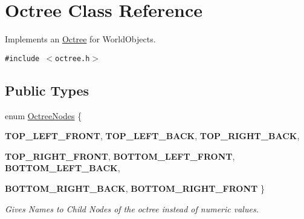 \hypertarget{class_octree}{
\section{Octree Class Reference}
\label{class_octree}
}
Implements an \hyperlink{class_octree}{Octree} for WorldObjects.  


{\tt \#include $<$octree.h$>$}

\subsection*{Public Types}
\begin{CompactItemize}
\item 
enum \hyperlink{class_octree_0279a06c2f71637befe827a037c89311}{OctreeNodes} \{ \par
\textbf{TOP\_\-LEFT\_\-FRONT}, 
\textbf{TOP\_\-LEFT\_\-BACK}, 
\textbf{TOP\_\-RIGHT\_\-BACK}, 
\par
\textbf{TOP\_\-RIGHT\_\-FRONT}, 
\textbf{BOTTOM\_\-LEFT\_\-FRONT}, 
\textbf{BOTTOM\_\-LEFT\_\-BACK}, 
\par
\textbf{BOTTOM\_\-RIGHT\_\-BACK}, 
\textbf{BOTTOM\_\-RIGHT\_\-FRONT}
 \}
\begin{CompactList}\small\item\em Gives Names to Child Nodes of the octree instead of numeric values. \item\end{CompactList}\end{CompactItemize}
